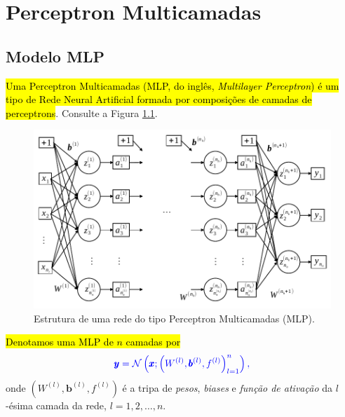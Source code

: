 
\chapter{Perceptron Multicamadas}\label{cap_mlp}
\thispagestyle{fancy}

\section{Modelo MLP}\label{cap_mlp_sec_modelo}

\hl{Uma Perceptron Multicamadas (MLP, do inglês, \textit{Multilayer Perceptron}) é um tipo de Rede Neural Artificial formada por composições de camadas de perceptrons}. Consulte a Figura \ref{cap_mlp_sec_modelo}.

\begin{figure}[H]
  \centering
  \includegraphics[width=\textwidth]{./cap_mlp/dados/fig_mlp/fig}
  \caption{Estrutura de uma rede do tipo Perceptron Multicamadas (MLP).}
  \label{fig:cap_mlp_sec_modelo:fig:mlp}
\end{figure}

\hl{Denotamos uma MLP de $n$ camadas por}
\begin{equation}\color{blue}\pmb{y} = \mathcal{N}\left(\pmb{x}; \left(W^{(l)}, \pmb{b}^{(l)}, f^{(l)}\right)_{l=1}^{n}\right),
\end{equation}
onde $\left(W^{(l)}, \pmb{b}^{(l)}, f^{(l)}\right)$ é a tripa de \emph{pesos}, \emph{\textit{biases}} e \emph{função de ativação} da $l$-ésima camada da rede, $l=1, 2, \dotsc, n$.

